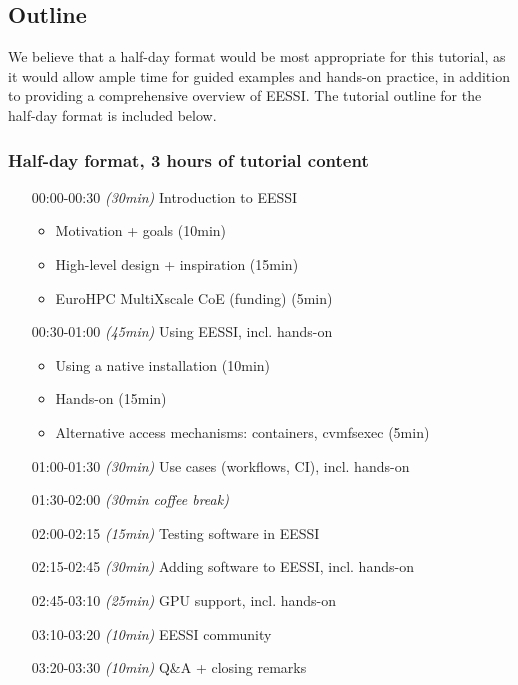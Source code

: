 
\subsection*{Outline}

We believe that a half-day format would be most appropriate for this tutorial, as it would allow ample time for guided
examples and hands-on practice, in addition to providing a comprehensive overview of EESSI. The tutorial outline for the half-day format is included below.


\subsubsection*{Half-day format, 3 hours of tutorial content}

\begin{itemize}[style=standard, labelwidth=1.9cm]


    \item [00:00-00:30] \emph{(30min)} Introduction to EESSI
     \begin{itemize}
         \item Motivation + goals (10min)
         \item High-level design + inspiration (15min)
         \item EuroHPC MultiXscale CoE (funding) (5min)
     \end{itemize}
    \item [00:30-01:00] \emph{(45min)} Using EESSI, incl. hands-on
     \begin{itemize}
         \item Using a native installation (10min)
         \item Hands-on (15min)
         \item Alternative access mechanisms: containers, cvmfsexec (5min)
     \end{itemize}
    \item [01:00-01:30] \emph{(30min)} Use cases (workflows, CI), incl. hands-on
    \item [01:30-02:00] \emph{(30min coffee break)}
    \item [02:00-02:15] \emph{(15min)} Testing software in EESSI  %
    \item [02:15-02:45] \emph{(30min)} Adding software to EESSI, incl. hands-on
    \item [02:45-03:10] \emph{(25min)} GPU support, incl. hands-on
    \item [03:10-03:20] \emph{(10min)} EESSI community
    \item [03:20-03:30] \emph{(10min)} Q\&A + closing remarks

\end{itemize}
